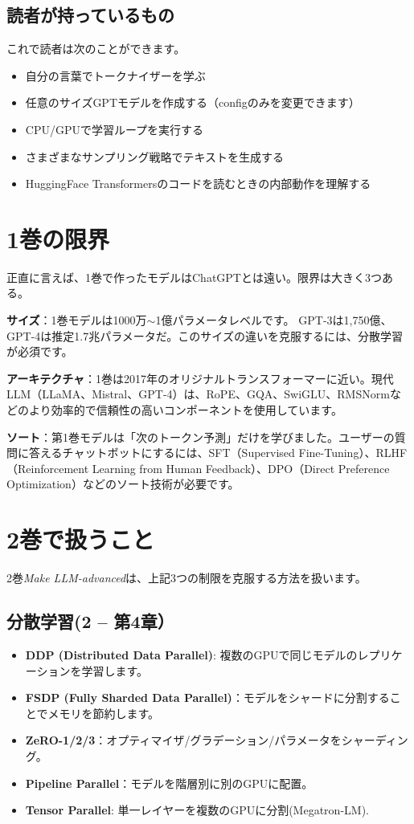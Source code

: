 \subsection{読者が持っているもの}

これで読者は次のことができます。
\begin{itemize}
\item 自分の言葉でトークナイザーを学ぶ
\item 任意のサイズGPTモデルを作成する（configのみを変更できます）
\item CPU/GPUで学習ループを実行する
\item さまざまなサンプリング戦略でテキストを生成する
\item HuggingFace Transformersのコードを読むときの内部動作を理解する
\end{itemize}

\section{1巻の限界}

正直に言えば、1巻で作ったモデルはChatGPTとは遠い。限界は大きく3つある。

\textbf{サイズ}：1巻モデルは1000万$\sim$1億パラメータレベルです。 GPT-3は1,750億、GPT-4は推定1.7兆パラメータだ。このサイズの違いを克服するには、分散学習が必須です。

\textbf{アーキテクチャ}：1巻は2017年のオリジナルトランスフォーマーに近い。現代LLM（LLaMA、Mistral、GPT-4）は、RoPE、GQA、SwiGLU、RMSNormなどのより効率的で信頼性の高いコンポーネントを使用しています。

\textbf{ソート}：第1巻モデルは「次のトークン予測」だけを学びました。ユーザーの質問に答えるチャットボットにするには、SFT（Supervised Fine-Tuning）、RLHF（Reinforcement Learning from Human Feedback）、DPO（Direct Preference Optimization）などのソート技術が必要です。

\section{2巻で扱うこと}

2巻\textit{Make LLM-advanced}は、上記3つの制限を克服する方法を扱います。

\subsection{分散学習(2  --  第4章）}

\begin{itemize}
\item\textbf{DDP (Distributed Data Parallel)}: 複数のGPUで同じモデルのレプリケーションを学習します。
\item\textbf{FSDP (Fully Sharded Data Parallel)}：モデルをシャードに分割することでメモリを節約します。
\item\textbf{ZeRO-1/2/3}：オプティマイザ/グラデーション/パラメータをシャーディング。
\item\textbf{Pipeline Parallel}：モデルを階層別に別のGPUに配置。
\item\textbf{Tensor Parallel}: 単一レイヤーを複数のGPUに分割(Megatron-LM).
\end{itemize}

